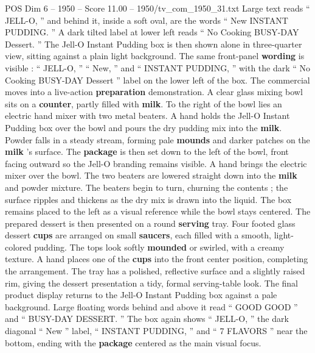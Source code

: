 \begin{textsample}{POS Dim 6 – 1950 – Score 11.00 – 1950/tv\_com\_1950\_31.txt}
Large text reads “ JELL-O, ” and behind it, inside a soft oval, are the words “ New INSTANT PUDDING. ” A dark tilted label at lower left reads “ No Cooking BUSY-DAY Dessert. ” The Jell-O Instant Pudding box is then shown alone in three-quarter view, sitting against a plain light background.
The same front-panel \textbf{wording} is visible : “ JELL-O, ” “ New, ” and “ INSTANT PUDDING, ” with the dark “ No Cooking BUSY-DAY Dessert ” label on the lower left of the box.
The commercial moves into a live-action \textbf{preparation} demonstration.
A clear glass mixing bowl sits on a \textbf{counter}, partly filled with \textbf{milk}.
To the right of the bowl lies an electric hand mixer with two metal beaters.
A hand holds the Jell-O Instant Pudding box over the bowl and pours the dry pudding mix into the \textbf{milk}.
Powder falls in a steady stream, forming pale \textbf{mounds} and darker patches on the \textbf{milk} ’s surface.
The \textbf{package} is then set down to the left of the bowl, front facing outward so the Jell-O branding remains visible.
A hand brings the electric mixer over the bowl.
The two beaters are lowered straight down into the \textbf{milk} and powder mixture.
The beaters begin to turn, churning the contents ; the surface ripples and thickens as the dry mix is drawn into the liquid.
The box remains placed to the left as a visual reference while the bowl stays centered.
The prepared dessert is then presented on a round \textbf{serving} tray.
Four footed glass dessert \textbf{cups} are arranged on small \textbf{saucers}, each filled with a smooth, light-colored pudding.
The tops look softly \textbf{mounded} or swirled, with a creamy texture.
A hand places one of the \textbf{cups} into the front center position, completing the arrangement.
The tray has a polished, reflective surface and a slightly raised rim, giving the dessert presentation a tidy, formal serving-table look.
The final product display returns to the Jell-O Instant Pudding box against a pale background.
Large floating words behind and above it read “ GOOD GOOD ” and “ BUSY-DAY DESSERT. ” The box again shows “ JELL-O, ” the dark diagonal “ New ” label, “ INSTANT PUDDING, ” and “ 7 FLAVORS ” near the bottom, ending with the \textbf{package} centered as the main visual focus.

\end{textsample}
